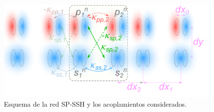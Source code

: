 \begin{figure}[H]
\centering
	\includegraphics[width=0.7\linewidth]{media/ssh_sp_model}
	\caption{Esquema de la red SP-SSH y los acoplamientos considerados.}
\end{figure}
